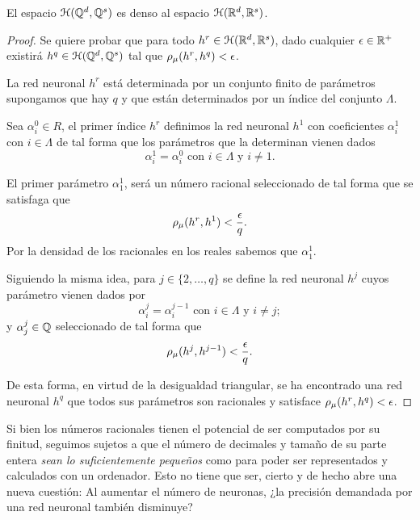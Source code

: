 \begin{aportacionOriginal}
    \begin{teorema}
        El espacio $\mathcal{H}(\mathbb{Q}^d, \mathbb{Q}^s)$ es denso al espacio $\mathcal{H}(\mathbb{R}^d,\mathbb{R}^s)$. 
    \end{teorema}
    \begin{proof}
        Se quiere probar que para todo $h^r \in \mathcal{H}(\mathbb{R}^d,\mathbb{R}^s)$,
         dado cualquier $\epsilon \in \mathbb{R}^+$  
        existirá $h^q \in \mathcal{H}(\mathbb{Q}^d, \mathbb{Q}^s)$ tal que 
        $\rho_{\mu}( h^r, h^q) < \epsilon$. 

        La red neuronal $h^r$ está determinada por un conjunto finito
        de parámetros supongamos que hay $q$ y que están determinados por un índice del conjunto $\Lambda$. 

        Sea $\alpha^0_i \in R$, el primer índice $h^r$ definimos la red neuronal $h^1$ con coeficientes  $\alpha^1_i$ con $i\in \Lambda$
        de tal forma que los parámetros que la determinan vienen dados 
        \begin{equation*}
            \alpha^1_i = \alpha^0_i 
            \text{ con } i \in \Lambda
            \text{ y } i \neq 1.
        \end{equation*}

        El primer parámetro $\alpha^1_1$, será un número racional 
        seleccionado de tal forma que se satisfaga que 
        \begin{equation*}
            \rho_{\mu}( h^r, h^1) < \frac{\epsilon}{q}.
        \end{equation*}
        Por la densidad de los racionales en los reales sabemos que  $\alpha^1_1$.

        Siguiendo la misma idea, para $j \in \{2,\ldots, q\}$ se define la red neuronal 
        $h^j$ cuyos parámetro vienen dados por 
        \begin{equation*}
            \alpha^j_i = \alpha^{j-1}_i 
            \text{ con } i \in \Lambda
            \text{ y } i \neq j;
        \end{equation*}
        y $\alpha^j_j \in \mathbb{Q}$ seleccionado de tal forma que  
        \begin{equation*}
            \rho_{\mu}( h^j, h^{j-1}) < \frac{\epsilon}{q}.
        \end{equation*}

        De esta forma, en virtud de la desigualdad triangular,  se ha encontrado una red neuronal $h^q$ que todos sus parámetros son racionales y 
        satisface 
        $\rho_{\mu}( h^r, h^q) < \epsilon$.
    \end{proof}

    Si bien los números racionales tienen el potencial de ser computados por su 
    finitud, seguimos sujetos a que el número de decimales y tamaño de su parte entera \textit{sean lo suficientemente pequeños} como para poder ser representados 
    y calculados con un ordenador. Esto no tiene que ser, cierto y de hecho abre una nueva cuestión:
     Al aumentar el número de neuronas, ¿la precisión demandada por una red neuronal también disminuye?  
\end{aportacionOriginal} 

